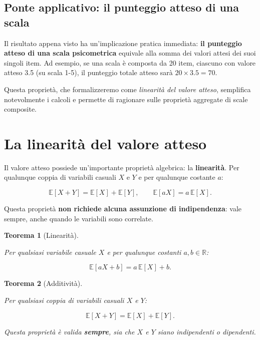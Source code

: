 \documentclass[
  italian,
  letterpaper,
  a4paper,
  11pt,
  open=any]{scrbook}
\theoremstyle{plain}
\newtheorem{theorem}{Teorema}[chapter]
\theoremstyle{definition}
\theoremstyle{definition}
\theoremstyle{remark}
\begin{document}
\subsection{Ponte applicativo: il punteggio atteso di una
scala}\label{ponte-applicativo-il-punteggio-atteso-di-una-scala}

Il risultato appena visto ha un'implicazione pratica immediata:
\textbf{il punteggio atteso di una scala psicometrica} equivale alla
somma dei valori attesi dei suoi singoli item. Ad esempio, se una scala
è composta da 20 item, ciascuno con valore atteso 3.5 (su scala 1-5), il
punteggio totale atteso sarà \(20 \times 3.5 = 70\).

Questa proprietà, che formalizzeremo come \emph{linearità del valore
atteso}, semplifica notevolmente i calcoli e permette di ragionare sulle
proprietà aggregate di scale composite.

\section{La linearità del valore
atteso}\label{sec-expected-value-linearity}

Il valore atteso possiede un'importante proprietà algebrica: la
\textbf{linearità}. Per qualunque coppia di variabili casuali \(X\) e
\(Y\) e per qualunque costante \(a\):

\[
\mathbb{E}[X + Y] = \mathbb{E}[X] + \mathbb{E}[Y],
\qquad
\mathbb{E}[aX] = a\,\mathbb{E}[X].
\]

Questa proprietà \textbf{non richiede alcuna assunzione di
indipendenza}: vale sempre, anche quando le variabili sono correlate.

\begin{theorem}[Linearità]\protect\hypertarget{thm-expected-value-linearity}{}\label{thm-expected-value-linearity}

Per qualsiasi variabile casuale \(X\) e per qualunque costanti
\(a,b \in \mathbb{R}\):

\[
\mathbb{E}[aX + b] = a\,\mathbb{E}[X] + b.
\]

\end{theorem}

\begin{theorem}[Additività]\protect\hypertarget{thm-expected-value-additivity}{}\label{thm-expected-value-additivity}

Per qualsiasi coppia di variabili casuali \(X\) e \(Y\):

\[
\mathbb{E}[X + Y] = \mathbb{E}[X] + \mathbb{E}[Y].
\]

Questa proprietà è valida \textbf{sempre}, sia che \(X\) e \(Y\) siano
indipendenti o dipendenti.

\end{theorem}
\end{document}
